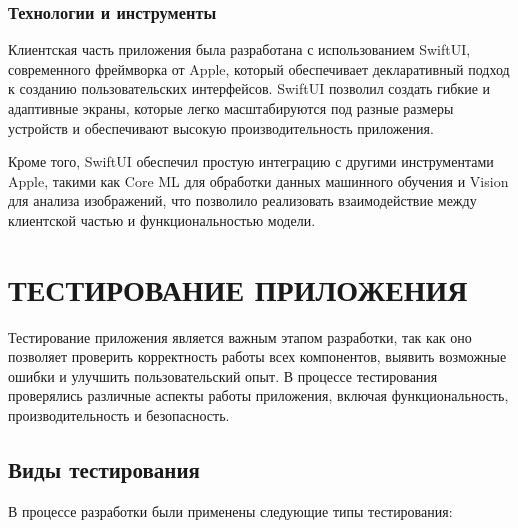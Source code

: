 {{    \subsubsection*{Технологии и инструменты}
    
    Клиентская часть приложения была разработана с использованием SwiftUI, современного фреймворка от Apple, который обеспечивает декларативный подход к созданию пользовательских интерфейсов. SwiftUI позволил создать гибкие и адаптивные экраны, которые легко масштабируются под разные размеры устройств и обеспечивают высокую производительность приложения.
    
    Кроме того, SwiftUI обеспечил простую интеграцию с другими инструментами Apple, такими как Core ML для обработки данных машинного обучения и Vision для анализа изображений, что позволило реализовать взаимодействие между клиентской частью и функциональностью модели.
    
}

\newpage

\section{\MakeUppercase{Тестирование приложения}}

Тестирование приложения является важным этапом разработки, так как оно позволяет проверить корректность работы всех компонентов, выявить возможные ошибки и улучшить пользовательский опыт. В процессе тестирования проверялись различные аспекты работы приложения, включая функциональность, производительность и безопасность.

\subsection{Виды тестирования}

В процессе разработки были применены следующие типы тестирования:

}
